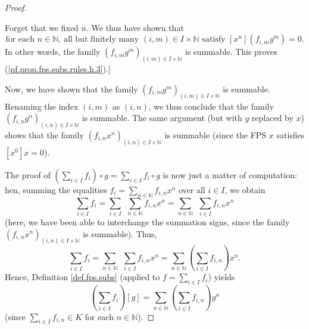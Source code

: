\begin{proof}
\begin{fineprint}
Forget that we fixed $n$. We thus have shown that%
\[
\text{for each }n\in\mathbb{N}\text{, all but finitely many }\left(
i,m\right)  \in I\times\mathbb{N}\text{ satisfy }\left[  x^{n}\right]  \left(
f_{i,m}g^{m}\right)  =0.
\]
In other words, the family $\left(  f_{i,m}g^{m}\right)  _{\left(  i,m\right)
\in I\times\mathbb{N}}$ is summable. This proves
(\ref{pf.prop.fps.subs.rules.h.3}).]
\end{fineprint}

Now, we have shown that the family $\left(  f_{i,m}g^{m}\right)  _{\left(
i,m\right)  \in I\times\mathbb{N}}$ is summable. Renaming the index $\left(
i,m\right)  $ as $\left(  i,n\right)  $, we thus conclude that the family
$\left(  f_{i,n}g^{n}\right)  _{\left(  i,n\right)  \in I\times\mathbb{N}}$ is
summable. The same argument (but with $g$ replaced by $x$) shows that the
family $\left(  f_{i,n}x^{n}\right)  _{\left(  i,n\right)  \in I\times
\mathbb{N}}$ is summable (since the FPS $x$ satisfies $\left[  x^{0}\right]
x=0$).

The proof of $\left(  \sum_{i\in I}f_{i}\right)  \circ g=\sum_{i\in I}%
f_{i}\circ g$ is now just a matter of computation: hen, summing the equalities
$f_{i}=\sum_{n\in\mathbb{N}}f_{i,n}x^{n}$ over all $i\in I$, we obtain%
\[
\sum_{i\in I}f_{i}=\sum_{i\in I}\ \ \sum_{n\in\mathbb{N}}f_{i,n}x^{n}%
=\sum_{n\in\mathbb{N}}\ \ \sum_{i\in I}f_{i,n}x^{n}%
\]
(here, we have been able to interchange the summation signs, since the family
$\left(  f_{i,n}x^{n}\right)  _{\left(  i,n\right)  \in I\times\mathbb{N}}$ is
summable). Thus,%
\[
\sum_{i\in I}f_{i}=\sum_{n\in\mathbb{N}}\ \ \sum_{i\in I}f_{i,n}x^{n}%
=\sum_{n\in\mathbb{N}}\left(  \sum_{i\in I}f_{i,n}\right)  x^{n}.
\]
Hence, Definition \ref{def.fps.subs} (applied to $f=\sum_{i\in I}f_{i}$)
yields%
\begin{equation}
\left(  \sum_{i\in I}f_{i}\right)  \left[  g\right]  =\sum_{n\in\mathbb{N}%
}\left(  \sum_{i\in I}f_{i,n}\right)  g^{n} \label{pf.prop.fps.subs.rules.h.5}%
\end{equation}
(since $\sum_{i\in I}f_{i,n}\in K$ for each $n\in\mathbb{N}$).


\end{proof}
